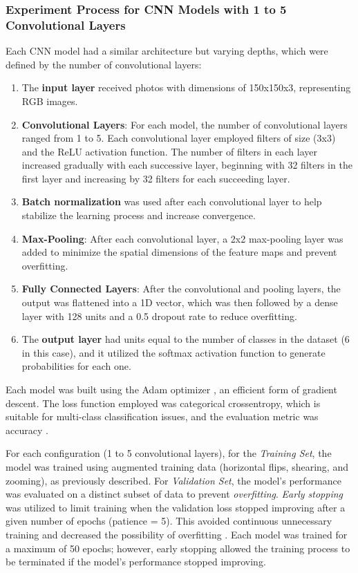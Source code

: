 \documentclass[conference]{IEEEtran}
\begin{document}
\subsubsection{Experiment Process for CNN Models with 1 to 5 Convolutional Layers} 
Each CNN model had a similar architecture but varying depths, which were defined by the number of convolutional layers:
\begin{enumerate}
    \item The \textbf{input layer} received photos with dimensions of 150x150x3, representing RGB images.

    \item \textbf{Convolutional Layers}: For each model, the number of convolutional layers ranged from 1 to 5. Each convolutional layer employed filters of size (3x3) and the ReLU activation function. The number of filters in each layer increased gradually with each successive layer, beginning with 32 filters in the first layer and increasing by 32 filters for each succeeding layer.

    \item \textbf{Batch normalization} was used after each convolutional layer to help stabilize the learning process and increase convergence.

    \item \textbf{Max-Pooling}: After each convolutional layer, a 2x2 max-pooling layer was added to minimize the spatial dimensions of the feature maps and prevent overfitting.
    
    \item \textbf{Fully Connected Layers}: After the convolutional and pooling layers, the output was flattened into a 1D vector, which was then followed by a dense layer with 128 units and a 0.5 dropout rate to reduce overfitting.

    \item The \textbf{output layer} had units equal to the number of classes in the dataset (6 in this case), and it utilized the softmax activation function to generate probabilities for each one.

\end{enumerate}

Each model was built using the Adam optimizer \cite{adam}, an efficient form of gradient descent. The loss function employed was categorical crossentropy, which is suitable for multi-class classification issues, and the evaluation metric was accuracy \cite{crossentropy}.

For each configuration (1 to 5 convolutional layers), for the \textit{Training Set}, the model was trained using augmented training data (horizontal flips, shearing, and zooming), as previously described. For \textit{Validation Set}, the model's performance was evaluated on a distinct subset of data to prevent \textit{overfitting}.
\textit{Early stopping} was utilized to limit training when the validation loss stopped improving after a given number of epochs (patience = 5). This avoided continuous unnecessary training and decreased the possibility of overfitting \cite{earlyStopping}.
Each model was trained for a maximum of 50 epochs; however, early stopping allowed the training process to be terminated if the model's performance stopped improving.
\end{document}
